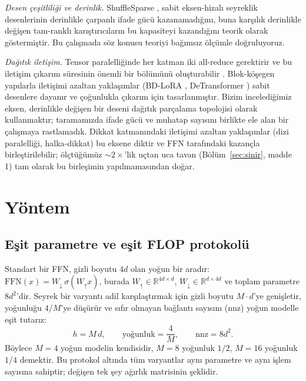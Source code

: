 \documentclass[10pt,journal]{IEEEtran}
\begin{document}
\emph{Desen çeşitliliği ve derinlik.} ShuffleSparse \cite{shufflesparse2025}, sabit
eksen-hizalı seyreklik desenlerinin derinlikle çarpanlı ifade gücü kazanamadığını, buna
karşılık derinlikle değişen tam-ranklı karıştırıcıların bu kapasiteyi kazandığını teorik
olarak göstermiştir. Bu çalışmada söz konusu teoriyi bağımsız ölçümle doğruluyoruz.

\emph{Dağıtık iletişim.} Tensor paralelliğinde her katman iki all-reduce gerektirir ve bu
iletişim çıkarım süresinin önemli bir bölümünü oluşturabilir \cite{flashcomm2024}.
Blok-köşegen yapılarla iletişimi azaltan yaklaşımlar (BD-LoRA \cite{bdlora2025},
DeTransformer \cite{detransformer2024}) sabit desenlere dayanır ve çoğunlukla çıkarım için
tasarlanmıştır. Bizim incelediğimiz eksen, derinlikle değişen bir deseni dağıtık parçalama
topolojisi olarak kullanmaktır; taramamızda ifade gücü ve muhatap sayısını birlikte ele alan
bir çalışmaya rastlamadık. Dikkat katmanındaki iletişimi azaltan yaklaşımlar (dizi
paralelliği, halka-dikkat) bu eksene diktir ve FFN tarafındaki kazançla birleştirilebilir;
ölçtüğümüz $\sim\!2\times$'lik uçtan uca tavan (Bölüm~\ref{sec:sinir}, madde 1) tam olarak bu
birleşimin yapılmamasından doğar.

\section{Yöntem}
\subsection{Eşit parametre ve eşit FLOP protokolü}
Standart bir FFN, gizli boyutu $4d$ olan yoğun bir aradır:
$\mathrm{FFN}(x) = W_{\downarrow}\,\sigma(W_{\uparrow}x)$, burada
$W_{\uparrow}\in\mathbb{R}^{4d\times d}$, $W_{\downarrow}\in\mathbb{R}^{d\times 4d}$ ve toplam
parametre $8d^2$'dir. Seyrek bir varyantı adil karşılaştırmak için gizli boyutu $M\!\cdot\!d$'ye
genişletir, yoğunluğu $4/M$'ye düşürür ve sıfır olmayan bağlantı sayısını (nnz) yoğun modelle
eşit tutarız:
\begin{equation}
h = M\,d, \qquad \text{yoğunluk} = \frac{4}{M}, \qquad \mathrm{nnz} = 8d^2 .
\end{equation}
Böylece $M=4$ yoğun modelin kendisidir, $M=8$ yoğunluk $1/2$, $M=16$ yoğunluk $1/4$ demektir.
Bu protokol altında tüm varyantlar aynı parametre ve aynı işlem sayısına sahiptir; değişen tek
şey ağırlık matrisinin şeklidir.
\end{document}
